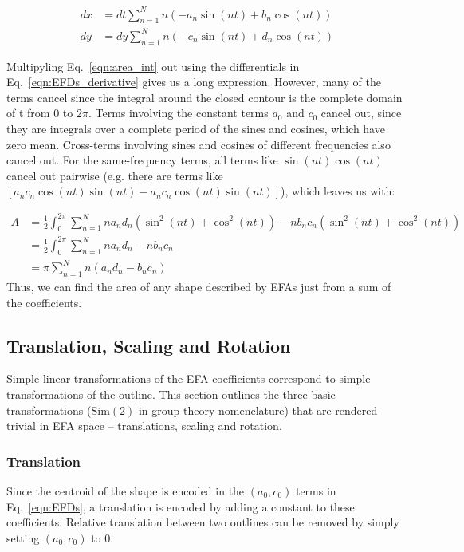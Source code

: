 \documentclass[11pt,a4paper,notitlepage]{article}
\begin{document}
\begin{equation}
	\label{eqn:EFDs_derivative}
	\begin{aligned}
		dx & = dt\sum_{n=1}^{N}
		n\left(
		-a_n\sin(nt) + b_n\cos(nt)
		\right)                 \\
		dy & = dy\sum_{n=1}^{N}
		n\left(
		-c_n\sin(nt) + d_n\cos(nt)
		\right)
	\end{aligned}
\end{equation}

Multipyling Eq.~\ref{eqn:area_int} out using the differentials in Eq.~\ref{eqn:EFDs_derivative} gives us a long
expression. However, many of the terms cancel since the integral around the closed contour is the complete domain of t from $0$ to $2\pi$.
Terms involving the constant terms $a_0$ and $c_0$ cancel out, since they are integrals over a complete period of the sines and cosines,
which have zero mean. Cross-terms involving sines and cosines of different frequencies also cancel out.
For the same-frequency terms, all terms like $\sin(nt)\cos(nt)$ cancel out pairwise (e.g. there are terms like
$\left[a_nc_n\cos(nt)\sin(nt) - a_nc_n\cos(nt)\sin(nt)\right]$), which leaves us with:

\begin{equation}
	\label{eqn:EFD_area_sums}
	\begin{aligned}
		A & = \frac{1}{2}\int_0^{2\pi}\sum_{n=1}^Nna_nd_n(\sin^2(nt) + \cos^2(nt)) - nb_nc_n(\sin^2(nt) + \cos^2(nt)) \\
		  & = \frac{1}{2}\int_0^{2\pi}\sum_{n=1}^Nna_nd_n - nb_nc_n                                                   \\
		  & = \pi\sum_{n=1}^Nn(a_nd_n - b_nc_n)
	\end{aligned}
\end{equation}
Thus, we can find the area of any shape described by EFAs just from a sum of the coefficients.

\subsection{Translation, Scaling and Rotation}
Simple linear transformations of the EFA coefficients correspond to simple transformations of the outline.
This section outlines the three basic transformations ($\mathrm{Sim}(2)$ in group theory nomenclature) that are rendered trivial in EFA space -- translations,
scaling and rotation.

\subsubsection{Translation}
Since the centroid of the shape is encoded in the $\left(a_0, c_0\right)$ terms in Eq.~\ref{eqn:EFDs},
a translation is encoded by adding a constant to these coefficients.
Relative translation between two outlines can be removed by simply setting $\left(a_0, c_0\right)$ to 0.
\end{document}
